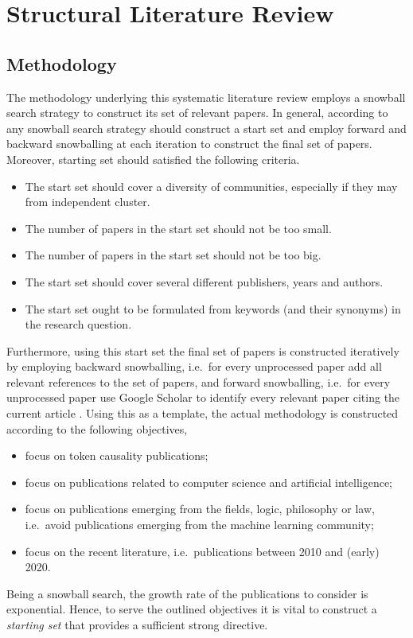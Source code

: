 \documentclass[11pt,a4paper]{book}
\theoremstyle{definition}
\theoremstyle{definition}
\theoremstyle{definition}
\theoremstyle{remark}
\begin{document}
\chapter{Structural Literature Review}

\section{Methodology}
\label{sec:methodology}

The methodology underlying this systematic literature review employs a snowball search strategy to construct its set of relevant papers. 
In general, according to \parencite{wohlin2014guidelines} any snowball search strategy should construct a start set and employ forward and backward snowballing at each iteration to construct the final set of papers. 
Moreover, starting set should satisfied the following criteria.
\begin{itemize}
\item The start set should cover a diversity of communities, especially if they may from independent cluster.
\item The number of papers in the start set should not be too small.
\item The number of papers in the start set should not be too big.
\item The start set should cover several different publishers, years and authors.
\item The start set ought to be formulated from keywords (and their synonyms) in the research question.
\end{itemize}
Furthermore, using this start set the final set of papers is constructed iteratively by employing backward snowballing, i.e.\ for every unprocessed paper add all relevant references to the set of papers, and forward snowballing, i.e.\ for every unprocessed paper use Google Scholar to identify every relevant paper citing the current article \parencite{wohlin2014guidelines}. Using this as a template, the actual methodology is constructed according to the following objectives,
\begin{itemize}
\item focus on token causality publications;
\item focus on publications related to computer science and artificial intelligence;
\item focus on publications emerging from the fields, logic, philosophy or law, i.e.\ avoid publications emerging from the machine learning community;
\item focus on the recent literature, i.e.\ publications between 2010 and (early) 2020.
\end{itemize}
Being a snowball search, the growth rate of the publications to consider is exponential. Hence, to serve the outlined objectives it is vital to construct a \emph{starting set} that provides a sufficient strong directive.
\bigskip
\end{document}
